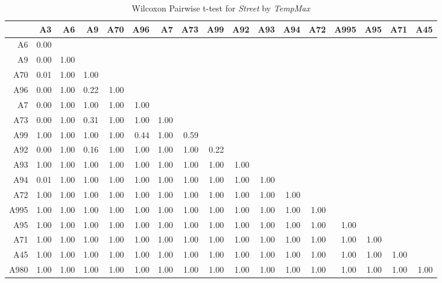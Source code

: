 \begin{table}[ht]
	\tiny
	\setlength{\tabcolsep}{4pt}
	\centering
	\begin{tabular}{rrrrrrrrrrrrrrrrr}
		\toprule
		& A3 & A6 & A9 & A70 & A96 & A7 & A73 & A99 & A92 & A93 & A94 & A72 & A995 & A95 & A71 & A45 \\ 
		\midrule
		A6 & 0.00 &  &  &  &  &  &  &  &  &  &  &  &  &  &  &  \\ 
		A9 & 0.00 & 1.00 &  &  &  &  &  &  &  &  &  &  &  &  &  &  \\ 
		A70 & 0.01 & 1.00 & 1.00 &  &  &  &  &  &  &  &  &  &  &  &  &  \\ 
		A96 & 0.00 & 1.00 & 0.22 & 1.00 &  &  &  &  &  &  &  &  &  &  &  &  \\ 
		A7 & 0.00 & 1.00 & 1.00 & 1.00 & 1.00 &  &  &  &  &  &  &  &  &  &  &  \\ 
		A73 & 0.00 & 1.00 & 0.31 & 1.00 & 1.00 & 1.00 &  &  &  &  &  &  &  &  &  &  \\ 
		A99 & 1.00 & 1.00 & 1.00 & 1.00 & 0.44 & 1.00 & 0.59 &  &  &  &  &  &  &  &  &  \\ 
		A92 & 0.00 & 1.00 & 0.16 & 1.00 & 1.00 & 1.00 & 1.00 & 0.22 &  &  &  &  &  &  &  &  \\ 
		A93 & 1.00 & 1.00 & 1.00 & 1.00 & 1.00 & 1.00 & 1.00 & 1.00 & 1.00 &  &  &  &  &  &  &  \\ 
		A94 & 0.01 & 1.00 & 1.00 & 1.00 & 1.00 & 1.00 & 1.00 & 1.00 & 1.00 & 1.00 &  &  &  &  &  &  \\ 
		A72 & 1.00 & 1.00 & 1.00 & 1.00 & 1.00 & 1.00 & 1.00 & 1.00 & 1.00 & 1.00 & 1.00 &  &  &  &  &  \\ 
		A995 & 1.00 & 1.00 & 1.00 & 1.00 & 1.00 & 1.00 & 1.00 & 1.00 & 1.00 & 1.00 & 1.00 & 1.00 &  &  &  &  \\ 
		A95 & 1.00 & 1.00 & 1.00 & 1.00 & 1.00 & 1.00 & 1.00 & 1.00 & 1.00 & 1.00 & 1.00 & 1.00 & 1.00 &  &  &  \\ 
		A71 & 1.00 & 1.00 & 1.00 & 1.00 & 1.00 & 1.00 & 1.00 & 1.00 & 1.00 & 1.00 & 1.00 & 1.00 & 1.00 & 1.00 &  &  \\ 
		A45 & 1.00 & 1.00 & 1.00 & 1.00 & 1.00 & 1.00 & 1.00 & 1.00 & 1.00 & 1.00 & 1.00 & 1.00 & 1.00 & 1.00 & 1.00 &  \\ 
		A980 & 1.00 & 1.00 & 1.00 & 1.00 & 1.00 & 1.00 & 1.00 & 1.00 & 1.00 & 1.00 & 1.00 & 1.00 & 1.00 & 1.00 & 1.00 & 1.00 \\ 
		\bottomrule
	\end{tabular}
	\caption{Wilcoxon Pairwise t-test for \textit{Street} by \textit{TempMax}}
\end{table}

